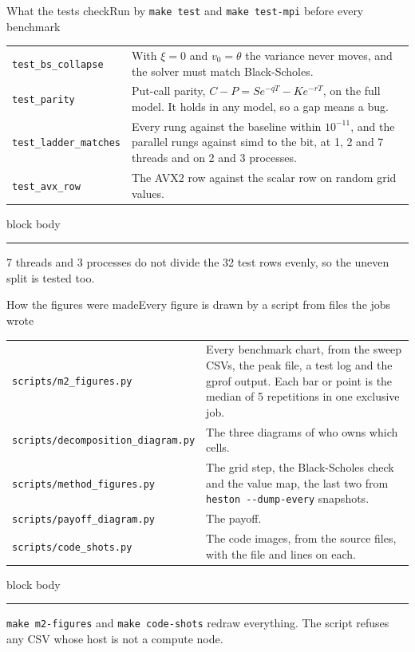 \documentclass[aspectratio=169,11pt]{beamer}
\newcommand{\sigcallout}[1]{%
  \vfill
  \begin{beamercolorbox}[wd=0.74\linewidth,sep=0.55em,rounded=true]{block body}
    \small{\color{sigblue}\rule{0.9ex}{0.9ex}}\hspace{0.5em}#1
  \end{beamercolorbox}%
}
\begin{document}
\begin{frame}{What the tests check}{Run by \texttt{make test} and \texttt{make test-mpi} before every benchmark}
  {\small
  \renewcommand{\arraystretch}{1.2}
  \begin{tabularx}{\linewidth}{@{}l X@{}}
    \toprule
    \texttt{test\_bs\_collapse} & With $\xi = 0$ and $v_0 = \theta$ the variance never moves, and the solver must match Black-Scholes. \\
    \texttt{test\_parity} & Put-call parity, $C - P = S e^{-qT} - K e^{-rT}$, on the full model. It holds in any model, so a gap means a bug. \\
    \texttt{test\_ladder\_matches} & Every rung against the baseline within $10^{-11}$, and the parallel rungs against simd to the bit, at 1, 2 and 7 threads and on 2 and 3 processes. \\
    \texttt{test\_avx\_row} & The AVX2 row against the scalar row on random grid values. \\
    \bottomrule
  \end{tabularx}}
  \sigcallout{7 threads and 3 processes do not divide the 32 test rows
    evenly, so the uneven split is tested too.}
\end{frame}

\begin{frame}{How the figures were made}{Every figure is drawn by a script from files the jobs wrote}
  {\footnotesize
  \renewcommand{\arraystretch}{1.15}
  \begin{tabularx}{\linewidth}{@{}l X@{}}
    \toprule
    \texttt{scripts/m2\_figures.py} & Every benchmark chart, from the sweep CSVs, the peak file, a test log and the gprof output. Each bar or point is the median of 5 repetitions in one exclusive job. \\
    \texttt{scripts/decomposition\_diagram.py} & The three diagrams of who owns which cells. \\
    \texttt{scripts/method\_figures.py} & The grid step, the Black-Scholes check and the value map, the last two from \texttt{heston -{}-dump-every} snapshots. \\
    \texttt{scripts/payoff\_diagram.py} & The payoff. \\
    \texttt{scripts/code\_shots.py} & The code images, from the source files, with the file and lines on each. \\
    \bottomrule
  \end{tabularx}}
  \sigcallout{\texttt{make m2-figures} and \texttt{make code-shots} redraw
    everything. The script refuses any CSV whose host is not a compute
    node.}
\end{frame}
\end{document}
